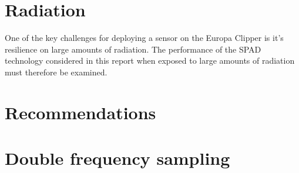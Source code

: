 \documentclass[]{report}
\begin{document}
\chapter{Radiation}\label{sec:radiation}
One of the key challenges for deploying a sensor on the Europa Clipper is it's resilience on large amounts of radiation. The performance of the SPAD technology considered in this report when exposed to large amounts of radiation must therefore be examined.



\clearpage


\clearpage



%


%


\chapter{Recommendations}\label{sec:recommendations}


\appendix
\chapter{Double frequency sampling}

\end{document}
